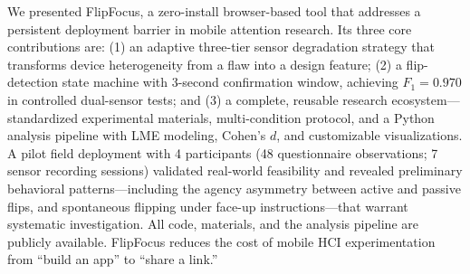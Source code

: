 \documentclass[sigconf]{acmart}
\begin{document}
We presented FlipFocus, a zero-install browser-based tool that addresses a persistent deployment barrier in mobile attention research. Its three core contributions are: (1) an adaptive three-tier sensor degradation strategy that transforms device heterogeneity from a flaw into a design feature; (2) a flip-detection state machine with 3-second confirmation window, achieving $F_1 = 0.970$ in controlled dual-sensor tests; and (3) a complete, reusable research ecosystem---standardized experimental materials, multi-condition protocol, and a Python analysis pipeline with LME modeling, Cohen's $d$, and customizable visualizations. A pilot field deployment with 4 participants (48 questionnaire observations; 7 sensor recording sessions) validated real-world feasibility and revealed preliminary behavioral patterns---including the agency asymmetry between active and passive flips, and spontaneous flipping under face-up instructions---that warrant systematic investigation. All code, materials, and the analysis pipeline are publicly available. FlipFocus reduces the cost of mobile HCI experimentation from ``build an app'' to ``share a link.''



\end{document}
